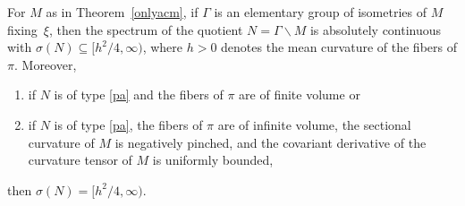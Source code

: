 \begin{Theorem}\label{onlyacn}
For $M$ as in Theorem~{\rm \ref{onlyacm}}, if $\Gamma$ is an elementary group of isometries of $M$ fixing~$\xi$,
then the spectrum of the quotient $N=\Gamma\backslash M$ is absolutely continuous
with $\sigma(N)\subseteq\bigl[h^2/4,\infty\bigr)$, where $h>0$ denotes the mean curvature of the fibers of $\pi$.
Moreover,
\begin{enumerate}[label={\rm (\arabic*)}]\itemsep=0pt
\item
if $N$ is of type {\rm \ref{pa}} and the fibers of $\pi$ are of finite volume or
\item
if $N$ is of type {\rm \ref{pa}}, the fibers of $\pi$ are of infinite volume,
the sectional curvature of $M$ is negatively pinched,
and the covariant derivative of the curvature tensor of $M$ is uniformly bounded,
\end{enumerate}
then $\sigma(N)=\bigl[h^2/4,\infty\bigr)$.
\end{Theorem}
